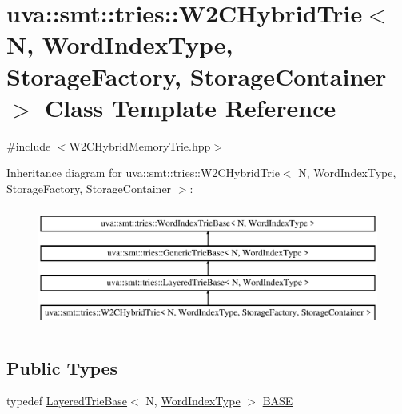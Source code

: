 \hypertarget{classuva_1_1smt_1_1tries_1_1_w2_c_hybrid_trie}{}\section{uva\+:\+:smt\+:\+:tries\+:\+:W2\+C\+Hybrid\+Trie$<$ N, Word\+Index\+Type, Storage\+Factory, Storage\+Container $>$ Class Template Reference}
\label{classuva_1_1smt_1_1tries_1_1_w2_c_hybrid_trie}


{\ttfamily \#include $<$W2\+C\+Hybrid\+Memory\+Trie.\+hpp$>$}

Inheritance diagram for uva\+:\+:smt\+:\+:tries\+:\+:W2\+C\+Hybrid\+Trie$<$ N, Word\+Index\+Type, Storage\+Factory, Storage\+Container $>$\+:\begin{figure}[H]
\begin{center}
\leavevmode
\includegraphics[height=4.000000cm]{classuva_1_1smt_1_1tries_1_1_w2_c_hybrid_trie}
\end{center}
\end{figure}
\subsection*{Public Types}
\begin{DoxyCompactItemize}
\item 
typedef \hyperlink{classuva_1_1smt_1_1tries_1_1_layered_trie_base}{Layered\+Trie\+Base}$<$ N, \hyperlink{classuva_1_1smt_1_1tries_1_1_word_index_trie_base_a30c4fffe3a3423c87b229b66340dd2f8}{Word\+Index\+Type} $>$ \hyperlink{classuva_1_1smt_1_1tries_1_1_w2_c_hybrid_trie_a564f0d64c8b9cd163191a35ada63cf65}{B\+A\+S\+E}
\end{DoxyCompactItemize}
